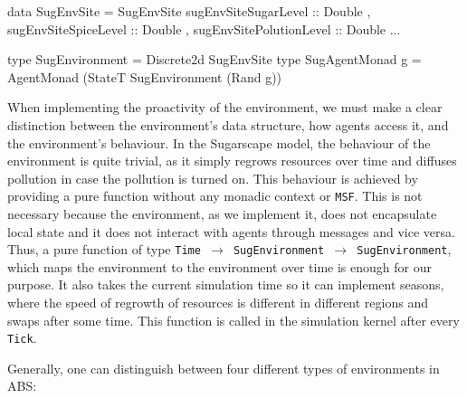 \begin{HaskellCode}
data SugEnvSite = SugEnvSite 
  { sugEnvSiteSugarLevel    :: Double
  , sugEnvSiteSpiceLevel    :: Double
  , sugEnvSitePolutionLevel :: Double
  ...
  }

type SugEnvironment  = Discrete2d SugEnvSite
type SugAgentMonad g = AgentMonad (StateT SugEnvironment (Rand g))
\end{HaskellCode}

When implementing the proactivity of the environment, we must make a clear distinction between the environment's data structure, how agents access it, and the environment's behaviour. In the Sugarscape model, the behaviour of the environment is quite trivial, as it simply regrows resources over time and diffuses pollution in case the pollution is turned on. This behaviour is achieved by providing a pure function without any monadic context or \texttt{MSF}. This is not necessary because the environment, as we implement it, does not encapsulate local state and it does not interact with agents through messages and vice versa. Thus, a pure function of type \texttt{Time $\rightarrow$ SugEnvironment $\rightarrow$ SugEnvironment}, which maps the environment to the environment over time is enough for our purpose. It also takes the current simulation time so it can implement seasons, where the speed of regrowth of resources is different in different regions and swaps after some time. This function is called in the simulation kernel after every \texttt{Tick}.

\medskip

Generally, one can distinguish between four different types of environments in ABS:

